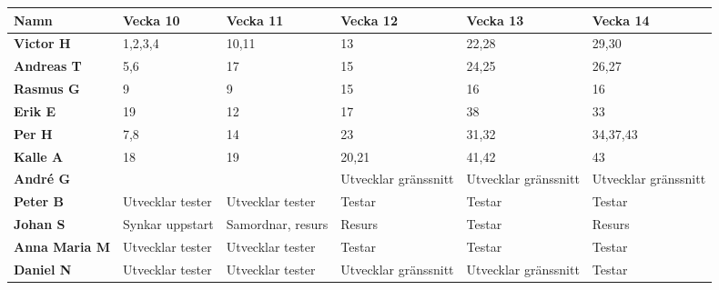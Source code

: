 \documentclass[a4paper, twoside, 11pt, titlepage]{article}
\begin{document}
	\begin {table} [ht] \begin{tabular} {  p{3.2cm} p{2cm} p{2cm} p{2cm} p{2cm} p{2cm} }
		\hline
		{\sffamily\textbf{Namn }} & {\sffamily\textbf{Vecka 10 }} & {\sffamily\textbf{Vecka 11 }} & {\sffamily\textbf{Vecka 12 }} & {\sffamily\textbf{Vecka 13 }} & {\sffamily\textbf{Vecka 14 }} \\
		\hline
		{\sffamily\textbf{Victor H }} & {1,2,3,4} & {10,11} & {13} & {22,28} & {29,30} \\
		\hline
		{\sffamily\textbf{Andreas T}} & {5,6} & {17} & {15} & {24,25} & {26,27} \\
		\hline
		{\sffamily\textbf{Rasmus G}} & {9} & {9} & {15} & {16} & {16} \\
		\hline
		{\sffamily\textbf{Erik E}} & { 19} & {12} & {17} & {38} & {33} \\
		\hline
		{\sffamily\textbf{Per H}} & {7,8} & {14} & {23} & {31,32} & {34,37,43} \\
		\hline
		{\sffamily\textbf{Kalle A}} & {18} & {19} & {20,21} & {41,42} & {43} \\
		\hline
		{\sffamily\textbf{André G}} & { } & {} & {Utvecklar gränssnitt} & {Utvecklar gränssnitt} & {Utvecklar gränssnitt} \\
		\hline
		{\sffamily\textbf{Peter B}} & {Utvecklar tester} & {Utvecklar tester} & {Testar} & {Testar} & {Testar} \\
		\hline
		{\sffamily\textbf{Johan S}} & {Synkar uppstart} & {Samordnar, resurs} & {Resurs} & {Testar} & {Resurs} \\
		\hline
		{\sffamily\textbf{Anna Maria M}} & {Utvecklar tester} & {Utvecklar tester} & {Testar} & {Testar} & {Testar} \\
		\hline
		{\sffamily\textbf{Daniel N}} & {Utvecklar tester} & {Utvecklar tester} & {Utvecklar gränssnitt} & {Utvecklar gränssnitt} & {Testar} \\
		\hline
	\end{tabular} \end{table} \FloatBarrier
	\vspace{6mm}
\end{document}
